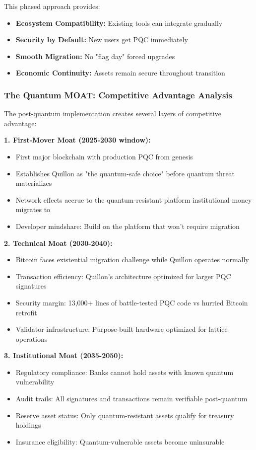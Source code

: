 \documentclass[11pt,a4paper]{article}
\begin{document}
This phased approach provides:
\begin{itemize}[leftmargin=*]
\item \textbf{Ecosystem Compatibility:} Existing tools can integrate gradually
\item \textbf{Security by Default:} New users get PQC immediately
\item \textbf{Smooth Migration:} No "flag day" forced upgrades
\item \textbf{Economic Continuity:} Assets remain secure throughout transition
\end{itemize}

\subsubsection{The Quantum MOAT: Competitive Advantage Analysis}

The post-quantum implementation creates several layers of competitive advantage:

\textbf{1. First-Mover Moat (2025-2030 window):}
\begin{itemize}[leftmargin=*]
\item First major blockchain with production PQC from genesis
\item Establishes Quillon as "the quantum-safe choice" before quantum threat materializes
\item Network effects accrue to the quantum-resistant platform institutional money migrates to
\item Developer mindshare: Build on the platform that won't require migration
\end{itemize}

\textbf{2. Technical Moat (2030-2040):}
\begin{itemize}[leftmargin=*]
\item Bitcoin faces existential migration challenge while Quillon operates normally
\item Transaction efficiency: Quillon's architecture optimized for larger PQC signatures
\item Security margin: 13,000+ lines of battle-tested PQC code vs hurried Bitcoin retrofit
\item Validator infrastructure: Purpose-built hardware optimized for lattice operations
\end{itemize}

\textbf{3. Institutional Moat (2035-2050):}
\begin{itemize}[leftmargin=*]
\item Regulatory compliance: Banks cannot hold assets with known quantum vulnerability
\item Audit trails: All signatures and transactions remain verifiable post-quantum
\item Reserve asset status: Only quantum-resistant assets qualify for treasury holdings
\item Insurance eligibility: Quantum-vulnerable assets become uninsurable
\end{itemize}
\end{document}
